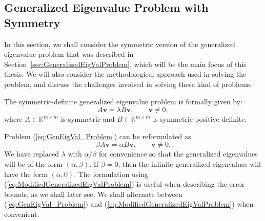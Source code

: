 \subsection{Generalized Eigenvalue Problem with Symmetry}\label{sec:ProblemDiscussion}

In this section, we shall consider the symmetric version of the generalized eigenvalue problem that was described in Section~\ref{sec:GeneralizedEigValProblem}, which will be the main focus of this thesis. We will also consider the methodological approach used in solving the problem, and discuss the challenges involved in solving these kind of problems.

The symmetric-definite generalized eigenvalue problem is formally given by:
\begin{equation}\label{eq:GenEigVal_Problem}
	A\mathbf{v} = \lambda B\mathbf{v}, \qquad \mathbf{v} \neq 0,
\end{equation}
where $A \in \mathbb{R}^{m \times m}$ is symmetric and $B \in \mathbb{R}^{m \times m}$ is symmetric positive definite.

Problem (\ref{eq:GenEigVal_Problem}) can be reformulated  as
\begin{equation}\label{eq:ModifiedGeneralizedEigValProblem}
	\beta A\mathbf{v} = \alpha B\mathbf{v}, \qquad \mathbf{v} \neq 0.
\end{equation}
We have replaced $\lambda$ with $\alpha/\beta$ for convenience so that the generalized eigenvalues will be of the form $(\alpha, \beta)$. If $ \beta = 0$, then the infinite generalized eigenvalues will have the form $(\alpha, 0)$. The formulation using (\ref{eq:ModifiedGeneralizedEigValProblem}) is useful when describing the error bounds, as we shall later see. We shall alternate between (\ref{eq:GenEigVal_Problem}) and (\ref{eq:ModifiedGeneralizedEigValProblem}) when convenient.

